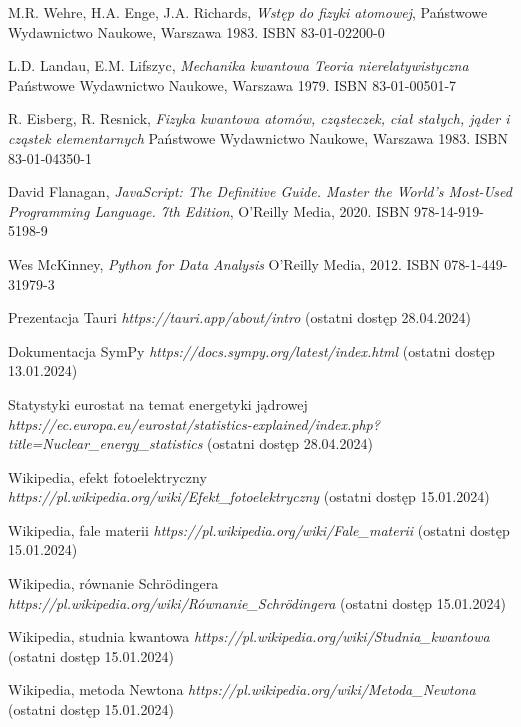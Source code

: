 \documentclass{SGGW-thesis}
\begin{document}
\begin{thebibliography}{9}
	M.R. Wehre, H.A. Enge, J.A. Richards,
	\textit{Wstęp do fizyki atomowej}, 
	Państwowe Wydawnictwo Naukowe, Warszawa 1983. ISBN 83-01-02200-0
	
	L.D. Landau, E.M. Lifszyc,
	\textit{Mechanika kwantowa Teoria nierelatywistyczna}
	Państwowe Wydawnictwo Naukowe, Warszawa 1979. ISBN 83-01-00501-7
	
	R. Eisberg, R. Resnick,
	\textit{Fizyka kwantowa atomów, cząsteczek, ciał stałych, jąder i cząstek elementarnych}
	Państwowe Wydawnictwo Naukowe, Warszawa 1983. ISBN 83-01-04350-1

	David Flanagan, 
	\textit{JavaScript: The Definitive Guide. Master the World's Most-Used Programming Language. 7th Edition}, 
	O'Reilly Media, 2020. ISBN 978-14-919-5198-9
	
	Wes McKinney,
	\textit{Python for Data Analysis}
	O'Reilly Media, 2012. ISBN 078-1-449-31979-3
	
	Prezentacja Tauri
	\textit{https://tauri.app/about/intro}
	(ostatni dostęp 28.04.2024)
	
	Dokumentacja SymPy
	\textit{https://docs.sympy.org/latest/index.html}
	(ostatni dostęp 13.01.2024)
	
	Statystyki eurostat na temat energetyki jądrowej
	\textit{https://ec.europa.eu/eurostat/statistics-explained/index.php?title=Nuclear\_energy\_statistics}
	(ostatni dostęp 28.04.2024)
	
	Wikipedia, efekt fotoelektryczny 
	\textit{https://pl.wikipedia.org/wiki/Efekt\_fotoelektryczny}
	(ostatni dostęp 15.01.2024)
	
	Wikipedia, fale materii
	\textit{https://pl.wikipedia.org/wiki/Fale\_materii}
	(ostatni dostęp 15.01.2024)
	
	Wikipedia, równanie Schrödingera
	\textit{https://pl.wikipedia.org/wiki/Równanie\_Schrödingera}
	(ostatni dostęp 15.01.2024)
	
	Wikipedia, studnia kwantowa
	\textit{https://pl.wikipedia.org/wiki/Studnia\_kwantowa}
	(ostatni dostęp 15.01.2024)
	
	Wikipedia, metoda Newtona
	\textit{https://pl.wikipedia.org/wiki/Metoda\_Newtona}
	(ostatni dostęp 15.01.2024) 
	

\end{thebibliography}
\end{document}

